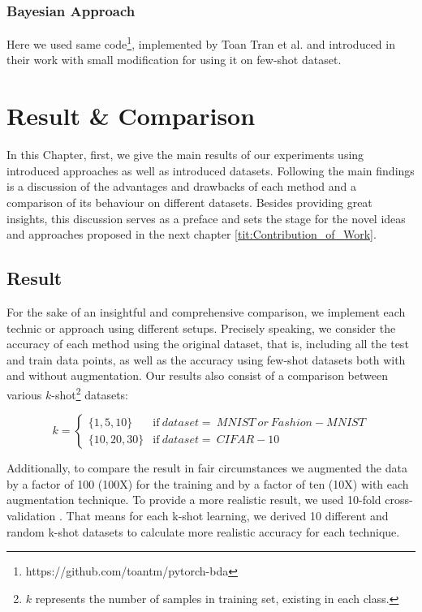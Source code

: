 \subsection{Bayesian Approach}
Here we used same code\footnote{https://github.com/toantm/pytorch-bda}, implemented by Toan Tran et
al. and introduced in their work \cite{refrence_bayesian_approach} with small modification for using
it on few-shot dataset.


\chapter{Result \& Comparison}
\label{tit:results}
In this Chapter, first, we give the main results of our experiments using introduced approaches as
well as introduced datasets. Following the main findings is a discussion of the advantages and
drawbacks of each method and a comparison of its behaviour on different datasets. Besides providing
great insights, this discussion serves as a preface and sets the stage for the novel ideas and
approaches proposed in the next chapter \ref{tit:Contribution_of_Work}. 

\section{Result}
For the sake of an insightful and comprehensive comparison, we implement each technic or approach
using different setups. Precisely speaking, we consider the accuracy of each method using the
original dataset, that is, including all the test and train data points, as well as the accuracy
using few-shot datasets both with and without augmentation. Our results also consist of a comparison
between various $k$-shot\footnote{$k$ represents the number of samples in training set, existing in
each class.} datasets:

\begin{equation}
  k=
  \begin{cases}
    \{1, 5, 10\}   & \text{if}\ dataset=
    \ MNIST \ or \ Fashion-MNIST                    \\
    \{10, 20, 30\} & \text{if}\ dataset= \ CIFAR-10
  \end{cases}
\end{equation}

Additionally, to compare the result in fair circumstances we augmented the data by a factor of 100 (100X)
for the training and by a factor of ten (10X) with each augmentation technique. To provide
a more realistic result, we used 10-fold cross-validation \cite{cross_validation}. That means for each k-shot learning, we
derived 10 different and random k-shot datasets to calculate more realistic accuracy for each
technique.


